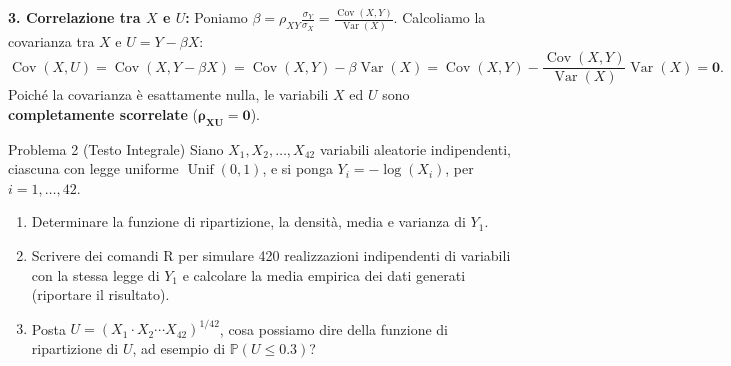 \documentclass[11pt,a4paper]{article}
\newcommand{\Prob}{\mathbb{P}}
\newcommand{\Var}{\operatorname{Var}}
\newcommand{\Cov}{\operatorname{Cov}}
\begin{document}
\begin{soluzionebox}
\textbf{3. Correlazione tra $X$ e $U$:}
Poniamo $\beta = \rho_{XY}\frac{\sigma_Y}{\sigma_X} = \frac{\Cov(X,Y)}{\Var(X)}$. Calcoliamo la covarianza tra $X$ e $U = Y - \beta X$:
\[
\Cov(X, U) = \Cov(X, Y - \beta X) = \Cov(X, Y) - \beta \Var(X) = \Cov(X, Y) - \frac{\Cov(X,Y)}{\Var(X)} \Var(X) = \bm{0}.
\]
Poiché la covarianza è esattamente nulla, le variabili $X$ ed $U$ sono \textbf{completamente scorrelate} ($\bm{\rho_{XU} = 0}$).
\end{soluzionebox}

\begin{problemabox}{Problema 2 (Testo Integrale)}
Siano $X_1, X_2, \dots, X_{42}$ variabili aleatorie indipendenti, ciascuna con legge uniforme $\operatorname{Unif}(0,1)$, e si ponga $Y_i = -\log(X_i)$, per $i=1,\dots,42$.
\begin{enumerate}
    \item Determinare la funzione di ripartizione, la densità, media e varianza di $Y_1$.
    \item Scrivere dei comandi R per simulare 420 realizzazioni indipendenti di variabili con la stessa legge di $Y_1$ e calcolare la media empirica dei dati generati (riportare il risultato).
    \item Posta $U = (X_1 \cdot X_2 \cdots X_{42})^{1/42}$, cosa possiamo dire della funzione di ripartizione di $U$, ad esempio di $\Prob(U \le 0.3)$?
\end{enumerate}
\end{problemabox}
\end{document}
